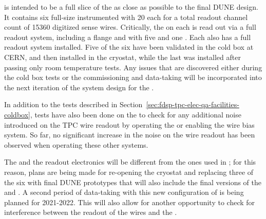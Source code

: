  is intended to be a full slice of the  as close as possible to the final DUNE \single design. It contains six full-size  instrumented with \num{20}  each for a total readout channel count of \num{15360} digitized sense wires. Critically, the  on each  is read out via a full  readout system, including a  flange and  with five  and one . Each  also has a full  readout system installed. Five of the six   have been validated in the cold box at CERN, and then installed in the  cryostat, while the last  was installed after passing only room temperature tests. Any issues that are discovered either during the cold box tests or the  commissioning and data-taking will be incorporated into the next iteration of the system design for the .

In addition to the tests described in Section~\ref{sec:fdsp-tpc-elec-qa-facilities-coldbox}, tests have also been done on the   to check for any additional noise introduced on the TPC wire readout by operating the  or enabling the wire bias  system. So far, no significant increase in the noise on the  wire readout has been observed when operating these other systems.

The  and the readout electronics will be different from the ones used in ; for this reason, plans are being made for re-opening the  cryostat and replacing three of the six  with final DUNE prototypes that will also include the final versions of the  and . A second period of data-taking with this new configuration of  is being planned for 2021-2022. This will also allow for another opportunity to check for interference between the readout of the  wires and the .
